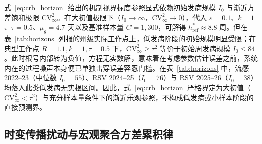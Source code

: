 \documentclass[11pt,a4paper]{article}
\theoremstyle{plain}
\theoremstyle{definition}
\begin{document}
式~\eqref{eq:crb_horizon} 给出的机制视界标度参照显式依赖初始发病规模 $I_0$ 与渐近方差饱和极限 $\text{CV}^2_\infty$。在大初值极限下（$I_0 \to \infty$，$\text{CV}^2_\infty \to 0$），代入 $\varepsilon=0.1$、$k=1$、$\tau=0.5$、$\mu_g=4.7$ 天以及基准样本量 $C=1{,}300$，可解得 $h^*_{\text{ref}} \approx 8.8$ 周。但在表~\ref{tab:horizons} 列报的州级实际工作点上，低发病阶段的初始规模明显受限；在典型工作点 $R=1.1, k=1, \tau=0.5$ 下，$\text{CV}^2_\infty \ge \tau^2$ 等价于初始周发病规模 $I_0 \le 84$。此时根号内部转为负值，方程无实数解，意味着在考虑参数估计误差之前，系统内在的过程噪声本身便已单独击穿误差容忍门槛。在表~\ref{tab:horizons} 中，流感 2022--23（中位数 $I_0=55$）、RSV 2024--25（$I_0=76$）与 RSV 2025--26（$I_0=38$）均落入此类低发病无实根区间。因此，式~\eqref{eq:crb_horizon} 严格界定为大初值（$\text{CV}^2_\infty < \tau^2$）与充分样本量条件下的渐近乐观参照，不构成低发病或小样本阶段的直接预测界。



\subsection{时变传播扰动与宏观聚合方差累积律}
\end{document}
